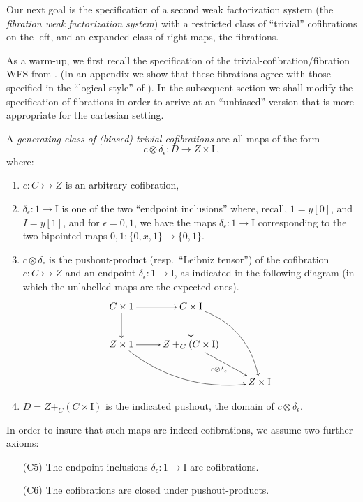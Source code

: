 \documentclass[11pt]{article}
\newcommand{\mono}{\ensuremath{\rightarrowtail}}
\newcommand{\I}{\ensuremath{\mathrm{I}}}
\theoremstyle{remark}
\theoremstyle{definition}
\begin{document}
Our next goal is the specification of a second weak factorization system (the \emph{fibration weak factorization system}) with a restricted class of ``trivial'' cofibrations on the left, and an expanded class of right maps, the fibrations. 

As a warm-up, we first recall the specification of the trivial-cofibration/fibration WFS from \cite{GS}.  (In an appendix we show that these fibrations agree with those specified in the ``logical style'' of \cite{CCHM,OP}).  In the subsequent section we shall modify the specification of fibrations in order to arrive at an ``unbiased'' version that is more appropriate for the cartesian setting.

A \emph{generating class of (biased) trivial cofibrations} are all maps of the form
\begin{equation}\label{eq:genclasstrivcof}
c \otimes \delta_\epsilon : D \to Z\times \I\,,
\end{equation}
where:
\begin{enumerate}
\item  $c : C \mono Z$ is an arbitrary cofibration,

\item $\delta_\epsilon : 1 \to \I$ is one of the two ``endpoint inclusions'' where, recall, $1 = y[0]$, and $I=y[1]$, and for $\epsilon = 0,1$, we have the maps $\delta_\epsilon : 1 \to \I$ corresponding to the two bipointed maps $0,1 : \{0, x, 1\} \to \{0,1\}$.

\item $c\otimes\delta_\epsilon$ is the pushout-product (resp.\ ``Leibniz tensor'') of the cofibration $c : C\mono Z$ and an endpoint $\delta_\epsilon:1 \to \I$, as indicated in the following diagram (in which the unlabelled maps are the expected ones).
\begin{equation}\label{diagram:pushoutproduct}
\xymatrix{
C\times 1 \ar[d] \ar[r] & C\times \I \ar[d] \ar@/^4ex/ [rdd]\\
Z\times 1 \ar@/_4ex/ [rrd] \ar[r] &  Z +_C (C\times\I) \ar[rd]_{c \otimes \delta_\epsilon} \\
&& Z\times\I
}
\end{equation}

\item $D = Z +_C (C\times\I)$ is the indicated pushout, the domain of $c \otimes \delta_\epsilon$.
\end{enumerate}

In order to insure that such maps are indeed cofibrations, we assume  two further axioms:
\begin{enumerate}
\item[(C5)] The endpoint inclusions $\delta_\epsilon : 1 \to \I$ are cofibrations.
\item[(C6)] The cofibrations are closed under pushout-products.  
\end{enumerate}
\end{document}
